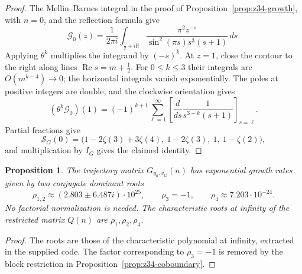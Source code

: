 \documentclass[11pt]{article}
\newtheorem{proposition}{Proposition}
\begin{document}
\begin{proof}
The Mellin--Barnes integral in the proof of
Proposition~\ref{prop:z34-growth}, with $n=0$, and the reflection formula
\cite[Eq.~5.5.3]{DLMF} give
\[
\mathcal{G}_0(z)=\frac{1}{2\pi i}\int_{\frac12+i\mathbb R}
\frac{\pi^2z^{-s}}{\sin^2(\pi s)s^3(s+1)}\,ds.
\]
Applying $\theta^k$ multiplies the integrand by $(-s)^k$.
At $z=1$, close the contour to the right along lines
$\operatorname{Re}s=m+\tfrac12$. For $0\leq k\leq3$ their integrals are
$O(m^{k-4})\to0$; the horizontal integrals vanish exponentially.
The poles at positive integers are double, and the clockwise orientation gives
\[
(\theta^k\mathcal{G}_0)(1)
=(-1)^{k+1}\sum_{\ell=1}^{\infty}
\left[\frac{d}{ds}\frac{1}{s^{3-k}(s+1)}\right]_{s=\ell}.
\]
Partial fractions give
\[
\mathcal{S}_G(0)=\bigl(
1-2\zeta(3)+3\zeta(4),\ 1-2\zeta(3),\ 1,\ 1-\zeta(2)\bigr),
\]
and multiplication by $I_G$ gives the claimed identity.
\end{proof}

\begin{proposition}
\label{prop:z34-rates}
The trajectory matrix $G_{y_0,v_G}(n)$ has exponential growth rates given by
two conjugate dominant roots
\[
\rho_{1,2}\approx(2.803\pm6.487i)\cdot10^{25},
\qquad \rho_3=-1,
\qquad \rho_4\approx7.203\cdot10^{-24}.
\]
No factorial normalization is needed. The characteristic roots at infinity
of the restricted matrix $Q(n)$ are $\rho_1,\rho_2,\rho_4$.
\end{proposition}

\begin{proof}
The roots are those of the characteristic polynomial at infinity, extracted
in the supplied code. The factor corresponding to $\rho_3=-1$ is removed
by the block restriction in Proposition~\ref{prop:z34-coboundary}.
\end{proof}
\end{document}
